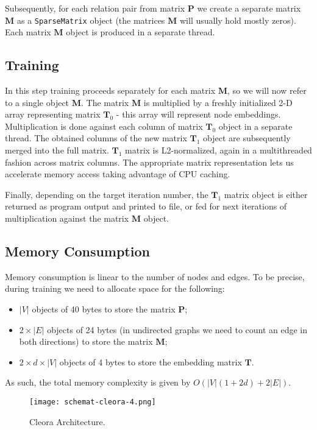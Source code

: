 \documentclass{IEEEtran}
\begin{document}
Subsequently, for each relation pair from matrix $\textbf{P}$ we create a separate matrix $\textbf{M}$ as a  \texttt{SparseMatrix} object (the matrices $\textbf{M}$ will usually hold mostly zeros). Each matrix $\textbf{M}$ object is produced in a separate thread.


\subsection{Training}
In this step training proceeds separately for each matrix $\textbf{M}$, so we will now refer to a single object $\textbf{M}$. The matrix $\textbf{M}$ is multiplied by a freshly initialized 2-D array representing matrix $\mathbf{T}_0$ - this array will represent node embeddings. Multiplication is done against each column of matrix $\mathbf{T}_0$ object in a separate thread. The obtained columns of the new matrix $\mathbf{T}_1$ object are subsequently merged into the full matrix. $\mathbf{T}_1$ matrix is L2-normalized, again in a multithreaded fashion across matrix columns. The appropriate matrix representation lets us accelerate memory access taking advantage of CPU caching.

Finally, depending on the target iteration number, the $\mathbf{T}_1$ matrix object is either returned as program output and printed to file, or fed for next iterations of multiplication against the matrix $\textbf{M}$ object.

\subsection{Memory Consumption}

Memory consumption is linear to the number of nodes and edges. To be precise, during training we need to allocate space for the following:

\begin{itemize}
    \item $|V|$ objects of 40 bytes to store the matrix $\textbf{P}$;
    \item $2 \times |E|$ objects of 24 bytes (in undirected graphs we need to count an edge in both directions) to store the matrix $\textbf{M}$;
    \item $2 \times d \times |V|$ objects of 4 bytes to store the embedding matrix $\textbf{T}$.
\end{itemize}

As such, the total memory complexity is given by $O(|V|(1+2d) + 2|E|)$.
 
 \begin{figure*}\centering
\texttt{[image: schemat-cleora-4.png]}
\caption{Cleora Architecture.}
\label{fig_implementation}
\end{figure*}
 
\end{document}
